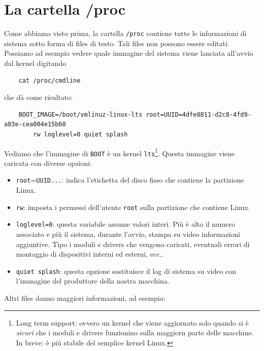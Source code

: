 \section{La cartella /proc}
Come abbiamo visto prima, la cartella \verb*|/proc| contiene tutte le informazioni di sistema sotto forma di files di testo. Tali files non possono essere editati. Possiamo ad esempio vedere quale immagine del sistema viene lanciata all'avvio dal kernel digitando
\begin{verbatim}
	cat /proc/cmdline
\end{verbatim}
che dà come risultato:
\begin{verbatim}
	BOOT_IMAGE=/boot/vmlinuz-linux-lts root=UUID=4dfe8811-d2c8-4fd9-a03e-cea004e15b60 
		rw loglevel=0 quiet splash	
\end{verbatim}
Vediamo che l'immagine di \verb*|BOOT| è un kernel \verb*|lts|\footnote{Long term support: ovvero un kernel che viene aggiornato solo quando si è \textit{sicuri} che i moduli e drivers funzionino sulla maggiorn parte delle macchine. In breve: è più stabile del semplice kernel Linux.}. Questa immagine viene caricata con diverse opzioni:
\begin{itemize}
	\item \verb*|root|=\verb*|UUID...|: indica l'etichetta del disco fisso che contiene la partizione Linux. 
	\item \verb*|rw|: imposta i permessi dell'utente \verb*|root| sulla partizione che contiene Linux.
	\item \verb*|loglevel=0|: questa variabile assume valori interi. Più è alto il numero associato e più il sistema, durante l'avvio, stampa su video informazioni aggiuntive. Tipo i moduli e drivers che vengono caricati, eventuali errori di montaggio di dispositivi interni ed esterni, ecc..
	\item \verb*|quiet splash|: questa opzione sostituisce il log di sistema su video con l'immagine del produttore della nostra macchina.
\end{itemize}
Altri files danno maggiori informazioni, ad esempio:
